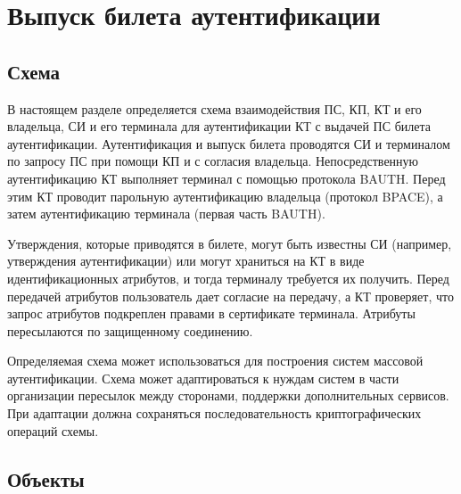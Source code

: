 \chapter{Выпуск билета аутентификации}\label{FLOW}

\section{Схема}\label{FLOW.Common}

В настоящем разделе определяется схема взаимодействия ПС, КП, КТ и его
владельца, СИ и его терминала для аутентификации КТ с выдачей ПС билета
аутентификации.
%
Аутентификация и выпуск билета проводятся СИ и терминалом по запросу ПС при 
помощи КП и с согласия владельца.
%
Непосредственную аутентификацию КТ выполняет терминал с помощью протокола BAUTH.
Перед этим КТ проводит парольную аутентификацию владельца (протокол BPACE), а
затем аутентификацию терминала (первая часть BAUTH).

Утверждения, которые приводятся в билете, могут быть известны СИ
(например, утверждения аутентификации) или могут храниться на КТ в виде 
идентификационных атрибутов, и тогда терминалу требуется их получить.
%
Перед передачей атрибутов пользователь дает согласие на передачу, а КТ 
проверяет, что запрос атрибутов подкреплен правами в сертификате 
терминала. Атрибуты пересылаются по защищенному соединению.

Определяемая схема может использоваться для построения систем массовой 
аутентификации. Схема может адаптироваться к нуждам систем в части 
организации пересылок между сторонами, поддержки дополнительных сервисов. 
При адаптации должна сохраняться последовательность криптографических 
операций схемы.

\section{Объекты}\label{FLOW.Obj}

